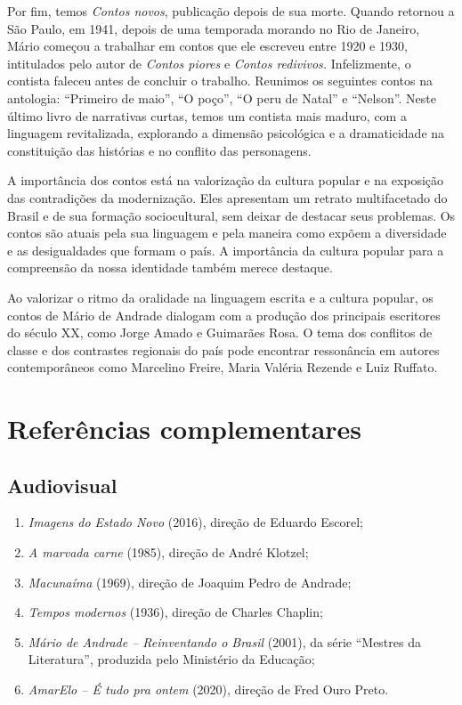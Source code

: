 \documentclass{article}
\begin{document}
Por fim, temos \emph{Contos novos}, publicação depois de sua morte.
Quando retornou a São Paulo, em 1941, depois de uma temporada morando no
Rio de Janeiro, Mário começou a trabalhar em contos que ele escreveu
entre 1920 e 1930, intitulados pelo autor de \emph{Contos piores} e
\emph{Contos redivivos.} Infelizmente, o contista faleceu antes de
concluir o trabalho. Reunimos os seguintes contos na antologia:
``Primeiro de maio'', ``O poço'', ``O peru de Natal'' e ``Nelson''.
Neste último livro de narrativas curtas, temos um contista mais maduro,
com a linguagem revitalizada, explorando a dimensão psicológica e a
dramaticidade na constituição das histórias e no conflito das
personagens.

A importância dos contos está na valorização da cultura popular e na
exposição das contradições da modernização. Eles apresentam um retrato
multifacetado do Brasil e de sua formação sociocultural, sem deixar de
destacar seus problemas. Os contos são atuais pela sua linguagem e pela
maneira como expõem a diversidade e as desigualdades que formam o país.
A importância da cultura popular para a compreensão da nossa identidade
também merece destaque.

Ao valorizar o ritmo da oralidade na linguagem escrita e a cultura
popular, os contos de Mário de Andrade dialogam com a produção dos
principais escritores do século XX, como Jorge Amado e Guimarães Rosa. O
tema dos conflitos de classe e dos contrastes regionais do país pode
encontrar ressonância em autores contemporâneos como Marcelino Freire,
Maria Valéria Rezende e Luiz Ruffato.

\section{Referências complementares}

\subsection{Audiovisual}

\begin{enumerate}
\item
  \emph{Imagens do Estado Novo} (2016), direção de Eduardo Escorel;
\item
  \emph{A marvada carne} (1985), direção de André Klotzel;
\item
  \emph{Macunaíma} (1969), direção de Joaquim Pedro de Andrade;
\item
  \emph{Tempos modernos} (1936), direção de Charles Chaplin;
\item
  \emph{Mário de Andrade -- Reinventando o Brasil} (2001), da série
  ``Mestres da Literatura'', produzida pelo Ministério da Educação;
\item
  \emph{AmarElo -- É tudo pra ontem} (2020), direção de Fred Ouro Preto.
\end{enumerate}
\end{document}
